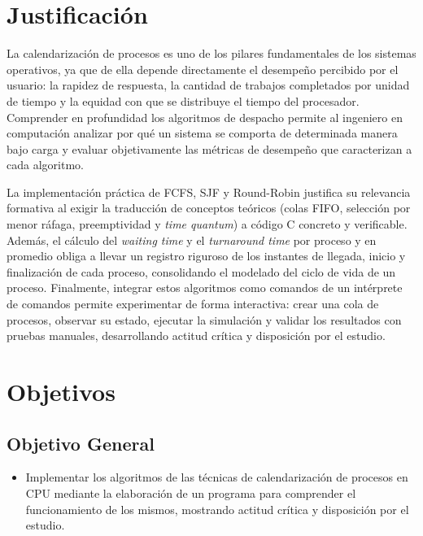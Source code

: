 \documentclass[12pt]{article}
\begin{document}
\section{Justificación}
    La calendarización de procesos es uno de los pilares fundamentales de los sistemas operativos, ya que de ella depende directamente el desempeño percibido por el usuario: la rapidez de respuesta, la cantidad de trabajos completados por unidad de tiempo y la equidad con que se distribuye el tiempo del procesador. Comprender en profundidad los algoritmos de despacho permite al ingeniero en computación analizar por qué un sistema se comporta de determinada manera bajo carga y evaluar objetivamente las métricas de desempeño que caracterizan a cada algoritmo. \par
    La implementación práctica de FCFS, SJF y Round-Robin justifica su relevancia formativa al exigir la traducción de conceptos teóricos (colas FIFO, selección por menor ráfaga, preemptividad y \textit{time quantum}) a código C concreto y verificable. Además, el cálculo del \textit{waiting time} y el \textit{turnaround time} por proceso y en promedio obliga a llevar un registro riguroso de los instantes de llegada, inicio y finalización de cada proceso, consolidando el modelado del ciclo de vida de un proceso. Finalmente, integrar estos algoritmos como comandos de un intérprete de comandos permite experimentar de forma interactiva: crear una cola de procesos, observar su estado, ejecutar la simulación y validar los resultados con pruebas manuales, desarrollando actitud crítica y disposición por el estudio.

\newpage
\section{Objetivos}
    \subsection{Objetivo General}
        \begin{itemize}
            \item Implementar los algoritmos de las técnicas de calendarización de procesos en CPU mediante la elaboración de un programa para comprender el funcionamiento de los mismos, mostrando actitud crítica y disposición por el estudio.
        \end{itemize}
\end{document}
